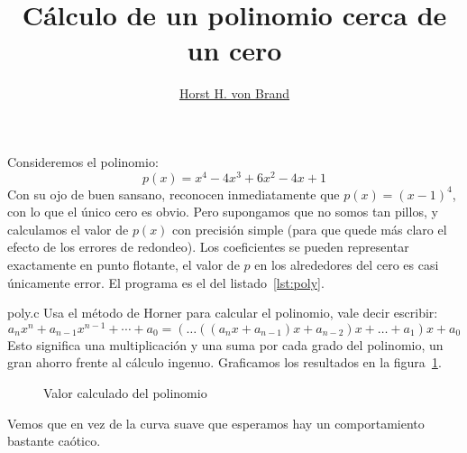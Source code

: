 \documentclass[english, spanish, fleqn]{article}
\title{Cálculo de un polinomio cerca de un cero}
\author{\href{mailto:vonbrand@inf.utfsm.cl}{Horst H. von Brand}}
\begin{document}
\lstset{language = [ANSI]C,
        basicstyle = \sffamily, commentstyle = \slshape,
        frame = lines, numbers = none,
        showstringspaces = false,
        float, floatplacement = ht, captionpos = b,
        xleftmargin = 1em, xrightmargin = 1em
       }

\renewcommand{\lstlistingname}{Listado}

\maketitle
\thispagestyle{empty}

  Consideremos el polinomio:
  \begin{equation*}
    p(x)
      = x^4 - 4 x^3 + 6 x^2 - 4 x + 1
  \end{equation*}
  Con su ojo de buen sansano,
  reconocen inmediatamente que \(p(x) = (x - 1)^4\),
  con lo que el único cero es obvio.
  Pero supongamos que no somos tan pillos,
  y calculamos el valor de \(p(x)\) con precisión simple
  (para que quede más claro el efecto de los errores de redondeo).
  Los coeficientes se pueden representar exactamente en punto flotante,
  el valor de \(p\) en los alrededores del cero
  es casi únicamente error.
  El programa es el del listado~\ref{lst:poly}.
  
                  {poly.c}
  Usa el método de Horner para calcular el polinomio,
  vale decir escribir:
  \begin{equation*}
    a_n x^n + a_{n - 1} x^{n - 1} + \dotsb + a_0
      = (\dotsc((a_n x + a_{n - 1}) x + a_{n - 2}) x + \dotsc + a_1) x + a_0
  \end{equation*}
  Esto significa una multiplicación y una suma por cada grado del polinomio,
  un gran ahorro frente al cálculo ingenuo.
  Graficamos los resultados en la figura~\ref{fig:poly}.
  \begin{figure}[ht]
    \centering
    \caption{Valor calculado del polinomio}
    \label{fig:poly}
  \end{figure}
  Vemos que en vez de la curva suave que esperamos
  hay un comportamiento bastante caótico.
\end{document}
